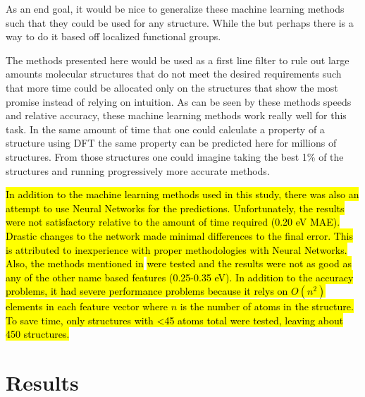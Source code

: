 \documentclass[10pt]{article}
\begin{document}
As an end goal, it would be nice to generalize these machine learning methods such that they could be used for any structure. While the but perhaps there is a way to do it based off localized functional groups.

The methods presented here would be used as a first line filter to rule out large amounts molecular structures that do not meet the desired requirements such that more time could be allocated only on the structures that show the most promise instead of relying on intuition. As can be seen by these methods speeds and relative accuracy, these machine learning methods work really well for this task. In the same amount of time that one could calculate a property of a structure using DFT the same property can be predicted here for millions of structures. From those structures one could imagine taking the best 1\% of the structures and running progressively more accurate methods.

\hl{In addition to the machine learning methods used in this study, there was also an attempt to use Neural Networks for the predictions. Unfortunately, the results were not satisfactory relative to the amount of time required (0.20 eV MAE). Drastic changes to the network made minimal differences to the final error. This is attributed to inexperience with proper methodologies with Neural Networks.}
\hl{Also, the methods mentioned in }\cite{hansen_assessment_2013} \hl{were tested and the results were not as good as any of the other name based features (0.25-0.35 eV). In addition to the accuracy problems, it had severe performance problems because it relys on $O(n^2)$ elements in each feature vector where $n$ is the number of atoms in the structure. To save time, only structures with <45 atoms total were tested, leaving about 450 structures.}

\nocite{ruddigkeit_enumeration_2012}
\nocite{darley_beyond_2008}
\nocite{frisch_gaussian_2009}
\nocite{montavon_machine_2013}
\nocite{handley_dynamically_2009}
\nocite{hansen_assessment_2013}
\nocite{schutt_how_2013}
\nocite{reymond_exploring_2012}
\nocite{whitfield_computational_2013}
\nocite{hansen_assessment_2013-1}
\nocite{ra_dft_2008}
\nocite{martell_assessment_1997}
\nocite{montavon_learning_2012}
\nocite{domingos_few_2012}
\nocite{martin_benchmark_1997}
\nocite{handley_potential_2010}
\nocite{rupp_fast_2012}


\newpage
\appendix

\section{Results}
\end{document}
